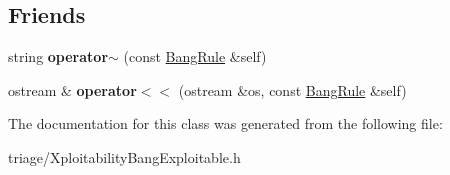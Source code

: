 \subsection*{Friends}
\begin{DoxyCompactItemize}
\item 
\mbox{\label{classsl2_1_1_bang_rule_ae4fc669251891cb1ca320076437bc710}} 
string {\bfseries operator$\sim$} (const \mbox{\hyperlink{classsl2_1_1_bang_rule}{Bang\+Rule}} \&self)
\item 
\mbox{\label{classsl2_1_1_bang_rule_aff09120446357835a92f14ad697b86f4}} 
ostream \& {\bfseries operator$<$$<$} (ostream \&os, const \mbox{\hyperlink{classsl2_1_1_bang_rule}{Bang\+Rule}} \&self)
\end{DoxyCompactItemize}


The documentation for this class was generated from the following file\+:\begin{DoxyCompactItemize}
\item 
triage/Xploitability\+Bang\+Exploitable.\+h\end{DoxyCompactItemize}
